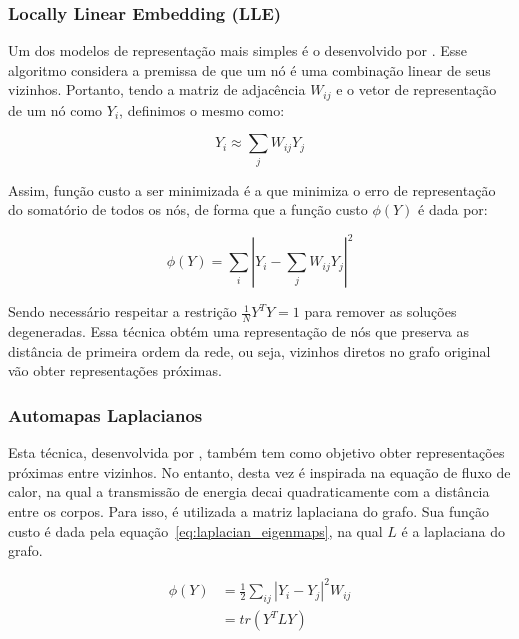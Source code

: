 \subsubsection{Locally Linear Embedding (LLE)}

Um dos modelos de representação mais simples é o desenvolvido por \citet{roweis00}.
Esse algoritmo considera a premissa de que um nó é uma combinação linear de
seus vizinhos.
Portanto, tendo a matriz de adjacência $W_{ij}$ e o vetor de representação de um
nó como $Y_i$, definimos o mesmo como:

\begin{equation}
    Y_i \approx \sum_j{W_{ij}Y_j}
\end{equation}

Assim, função custo a ser minimizada é a que minimiza o erro de representação
do somatório de todos os nós, de forma que a função custo $\phi(Y)$
é dada por:

\begin{equation}
    \phi(Y) = \sum_i{|Y_i - \sum_j{W_{ij}Y_j}|^2}
\end{equation}

Sendo necessário respeitar a restrição $\frac{1}{N}Y^TY = 1$ para remover as
soluções degeneradas.
Essa técnica obtém uma representação de nós que preserva as distância de
primeira ordem da rede, ou seja, vizinhos diretos no grafo original vão obter
representações próximas.

\subsubsection{Automapas Laplacianos}

Esta técnica, desenvolvida por \citet{belkin02}, também tem como objetivo obter
representações próximas entre vizinhos.
No entanto, desta vez é inspirada na equação de fluxo de calor, na qual a transmissão de
energia decai quadraticamente com a distância entre os corpos.
Para isso, é utilizada a matriz laplaciana do grafo.
Sua função custo é dada pela equação~\ref{eq:laplacian_eigenmaps}, na qual $L$ é
a laplaciana do grafo.

\begin{equation} \label{eq:laplacian_eigenmaps}
\begin{aligned}
    \phi(Y) &= \frac{1}{2} \sum_{ij}{|Y_i - Y_j|^2 W_{ij}} \\
            &= tr(Y^TLY)
\end{aligned}
\end{equation}

